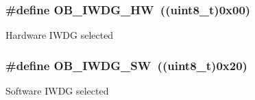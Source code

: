 \subsubsection[{O\+B\+\_\+\+I\+W\+D\+G\+\_\+\+H\+W}]{\setlength{\rightskip}{0pt plus 5cm}\#define O\+B\+\_\+\+I\+W\+D\+G\+\_\+\+H\+W~((uint8\+\_\+t)0x00)}\label{group___f_l_a_s_h___option___bytes___i_watchdog_gadfcbfa963d79c339ec8e2d5a7734e47a}
Hardware I\+W\+D\+G selected \hypertarget{group___f_l_a_s_h___option___bytes___i_watchdog_ga5a357e232c955444c3f2ccb9a937ffce}{}
\subsubsection[{O\+B\+\_\+\+I\+W\+D\+G\+\_\+\+S\+W}]{\setlength{\rightskip}{0pt plus 5cm}\#define O\+B\+\_\+\+I\+W\+D\+G\+\_\+\+S\+W~((uint8\+\_\+t)0x20)}\label{group___f_l_a_s_h___option___bytes___i_watchdog_ga5a357e232c955444c3f2ccb9a937ffce}
Software I\+W\+D\+G selected 